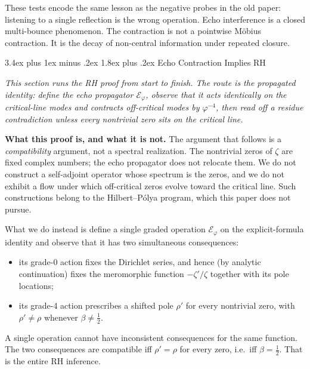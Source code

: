 \documentclass[11pt,a4paper]{article}
\makeatletter
\theoremstyle{plain}
\theoremstyle{definition}
\theoremstyle{remark}
\numberwithin{equation}{section}
\newcommand{\vp}{\varphi}
\renewcommand{\section}{%
  \@startsection{section}{1}{0pt}%
    {3.4ex plus 1ex minus .2ex}%
    {1.8ex plus .2ex}%
    {\normalfont\LARGE\bfseries\color{headingAccent}}%
}
\newenvironment{sectionopener}
  {\begin{sectionopenerframe}\small\itshape\ignorespaces}
  {\end{sectionopenerframe}}
\makeatother
\begin{document}
These tests encode the same lesson as the negative probes in the old
paper: listening to a single reflection is the wrong operation.  Echo
interference is a closed multi-bounce phenomenon.  The contraction is
not a pointwise M\"obius contraction.  It is the decay of non-central
information under repeated closure.

\section{Echo Contraction Implies RH}
\label{sec:rh}

\begin{sectionopener}
This section runs the RH proof from start to finish.  The route is
the propagated identity: define the echo propagator
$\mathcal{E}_\vp$, observe that it acts identically on the
critical-line modes and contracts off-critical modes by $\vp^{-4}$,
then read off a residue contradiction unless every nontrivial zero
sits on the critical line.
\end{sectionopener}

\medskip\noindent\textbf{What this proof is, and what it is not.}
The argument that follows is a \emph{compatibility} argument, not
a spectral realization.  The nontrivial zeros of $\zeta$ are fixed
complex numbers; the echo propagator does not relocate them.  We
do not construct a self-adjoint operator whose spectrum is the zeros,
and we do not exhibit a flow under which off-critical zeros evolve
toward the critical line.  Such constructions belong to the
Hilbert--P\'olya program, which this paper does not pursue.

What we do instead is define a single graded operation
$\mathcal{E}_\vp$ on the explicit-formula identity and observe that
it has two simultaneous consequences:
\begin{itemize}
  \item its grade-0 action fixes the Dirichlet series, and hence
    (by analytic continuation) fixes the meromorphic function
    $-\zeta'/\zeta$ together with its pole locations;
  \item its grade-4 action prescribes a shifted pole $\rho'$ for
    every nontrivial zero, with $\rho'\ne\rho$ whenever
    $\beta\ne\tfrac12$.
\end{itemize}
A single operation cannot have inconsistent consequences for the
same function.  The two consequences are compatible iff
$\rho'=\rho$ for every zero, i.e.\ iff $\beta=\tfrac12$.  That is
the entire RH inference.
\end{document}
